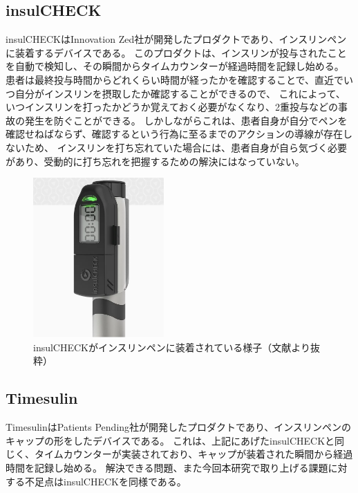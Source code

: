 \subsection{insulCHECK}

insulCHECKはInnovation Zed社が開発したプロダクトであり、インスリンペンに装着するデバイスである。
このプロダクトは、インスリンが投与されたことを自動で検知し、その瞬間からタイムカウンターが経過時間を記録し始める。
患者は最終投与時間からどれくらい時間が経ったかを確認することで、直近でいつ自分がインスリンを摂取したか確認することができるので、
これによって、いつインスリンを打ったかどうか覚えておく必要がなくなり、2重投与などの事故の発生を防ぐことができる。
しかしながらこれは、患者自身が自分でペンを確認せねばならず、確認するという行為に至るまでのアクションの導線が存在しないため、
インスリンを打ち忘れていた場合には、患者自身が自ら気づく必要があり、受動的に打ち忘れを把握するための解決にはなっていない。

\begin{figure}[htbp]
  \caption{insulCHECKがインスリンペンに装着されている様子（文献\cite{insulcheck}より抜粋）}
  \label{fig:insulcheck_display}
  \begin{center}
    \includegraphics[bb=0 0 400 600,width=5cm]{assets/insulcheck_display.png}
  \end{center}
\end{figure}

\subsection{Timesulin}

TimesulinはPatients Pending社が開発したプロダクトであり、インスリンペンのキャップの形をしたデバイスである。
これは、上記にあげたinsulCHECKと同じく、タイムカウンターが実装されており、キャップが装着された瞬間から経過時間を記録し始める。
解決できる問題、また今回本研究で取り上げる課題に対する不足点はinsulCHECKを同様である。

